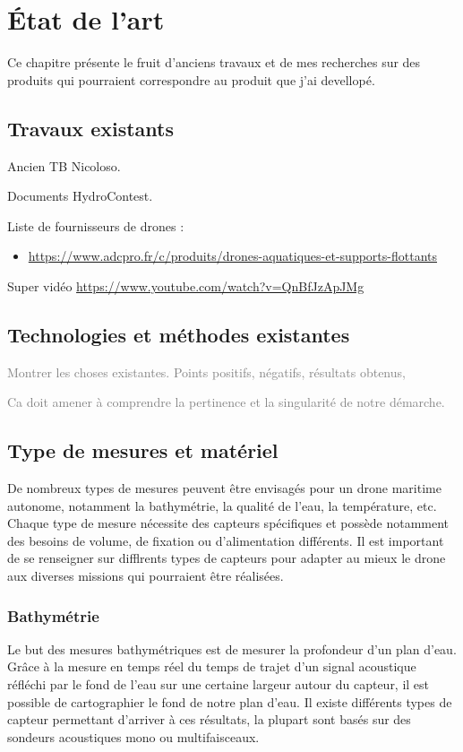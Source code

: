 \chapter{État de l'art}
Ce chapitre présente le fruit d'anciens travaux et de mes recherches sur des produits qui pourraient correspondre au produit que j'ai devellopé.

\section{Travaux existants}
Ancien TB Nicoloso.

Documents HydroContest.

Liste de fournisseurs de drones :
\begin{itemize}
    \item \url{https://www.adcpro.fr/c/produits/drones-aquatiques-et-supports-flottants}
\end{itemize}

Super vidéo \url{https://www.youtube.com/watch?v=QnBfJzApJMg}


\section{Technologies et méthodes existantes}

\textcolor{gray}{Montrer les choses existantes. Points positifs, négatifs, résultats obtenus,}

\textcolor{gray}{Ca doit amener à comprendre la pertinence et la singularité de notre démarche.}


\section{Type de mesures et matériel}
De nombreux types de mesures peuvent être envisagés pour un drone maritime autonome, notamment la bathymétrie, la qualité de l'eau, la température, etc. Chaque type de mesure nécessite des capteurs spécifiques et possède notamment des besoins de volume, de fixation ou d'alimentation différents. Il est important de se renseigner sur difflrents types de capteurs pour adapter au mieux le drone aux diverses missions qui pourraient être réalisées.

\subsection{Bathymétrie}
Le but des mesures bathymétriques est de mesurer la profondeur d'un plan d'eau. Grâce à la mesure en temps réel du temps de trajet d'un signal acoustique réfléchi par le fond de l'eau sur une certaine largeur autour du capteur, il est possible de cartographier le fond de notre plan d'eau. Il existe différents types de capteur permettant d'arriver à ces résultats, la plupart sont basés sur des sondeurs acoustiques mono ou multifaisceaux.

